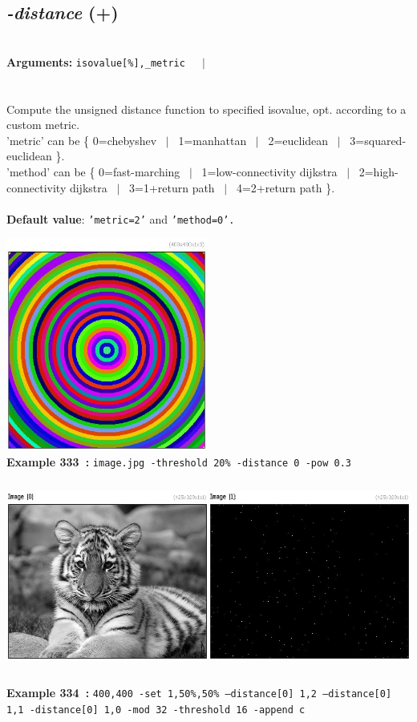 \documentclass[a4paper,11pt,twoside]{book}
\begin{document}
\subsection{\emph{-distance} (+)}\vspace*{-0.5em}
~\\\textbf{Arguments: } 
{\small \texttt{isovalue[\%],\_metric}}~~~$|$\\
\\~\\
Compute the unsigned distance function to specified isovalue, opt. according to a custom metric.
~\\'metric' can be \{ 0=chebyshev ~$|$~ 1=manhattan ~$|$~ 2=euclidean ~$|$~ 3=squared-euclidean \}.
~\\'method' can be \{ 0=fast-marching ~$|$~ 1=low-connectivity dijkstra ~$|$~ 2=high-connectivity dijkstra ~$|$~ 3=1+return path ~$|$~ 4=2+return path \}.
~\\~\\\textbf{Default value}: {\small \texttt{'metric=2'} and \texttt{'method=0'.}}
\begin{center}\includegraphics[keepaspectratio=true,height=7cm,width=\textwidth]{img/gmic_def333.jpg}\\
{\footnotesize \textbf{Example 333~:} \texttt{image.jpg -threshold 20\% -distance 0 -pow 0.3}}
\\\includegraphics[keepaspectratio=true,height=7cm,width=\textwidth]{img/gmic_def334.jpg}\\
{\footnotesize \textbf{Example 334~:} \texttt{400,400 -set 1,50\%,50\% --distance[0] 1,2 --distance[0] 1,1 -distance[0] 1,0 -mod 32 -threshold 16 -append c}}
\end{center}
\end{document}
